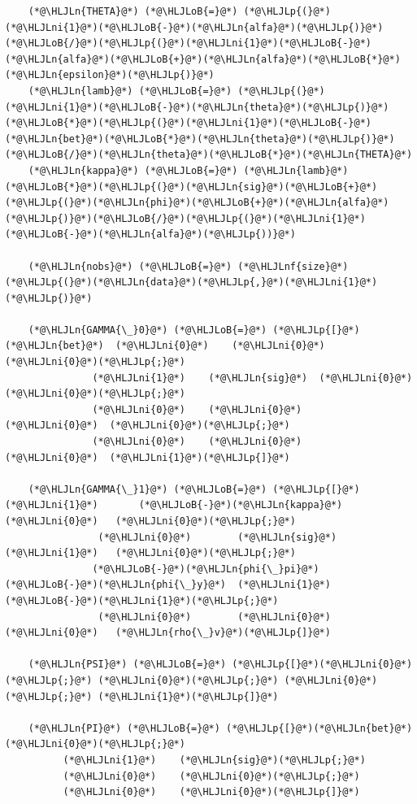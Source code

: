 \documentclass[12pt,a4paper]{article}
\newcommand{\HLJLn}[1]{#1}
\newcommand{\HLJLnf}[1]{\textcolor[RGB]{66,102,213}{#1}}
\newcommand{\HLJLni}[1]{\textcolor[RGB]{59,151,46}{#1}}
\newcommand{\HLJLoB}[1]{\textcolor[RGB]{102,102,102}{\textbf{#1}}}
\newcommand{\HLJLp}[1]{#1}
\begin{document}
\begin{lstlisting}
    (*@\HLJLn{THETA}@*) (*@\HLJLoB{=}@*) (*@\HLJLp{(}@*)(*@\HLJLni{1}@*)(*@\HLJLoB{-}@*)(*@\HLJLn{alfa}@*)(*@\HLJLp{)}@*)(*@\HLJLoB{/}@*)(*@\HLJLp{(}@*)(*@\HLJLni{1}@*)(*@\HLJLoB{-}@*)(*@\HLJLn{alfa}@*)(*@\HLJLoB{+}@*)(*@\HLJLn{alfa}@*)(*@\HLJLoB{*}@*)(*@\HLJLn{epsilon}@*)(*@\HLJLp{)}@*)
    (*@\HLJLn{lamb}@*) (*@\HLJLoB{=}@*) (*@\HLJLp{(}@*)(*@\HLJLni{1}@*)(*@\HLJLoB{-}@*)(*@\HLJLn{theta}@*)(*@\HLJLp{)}@*)(*@\HLJLoB{*}@*)(*@\HLJLp{(}@*)(*@\HLJLni{1}@*)(*@\HLJLoB{-}@*)(*@\HLJLn{bet}@*)(*@\HLJLoB{*}@*)(*@\HLJLn{theta}@*)(*@\HLJLp{)}@*)(*@\HLJLoB{/}@*)(*@\HLJLn{theta}@*)(*@\HLJLoB{*}@*)(*@\HLJLn{THETA}@*)
    (*@\HLJLn{kappa}@*) (*@\HLJLoB{=}@*) (*@\HLJLn{lamb}@*)(*@\HLJLoB{*}@*)(*@\HLJLp{(}@*)(*@\HLJLn{sig}@*)(*@\HLJLoB{+}@*)(*@\HLJLp{(}@*)(*@\HLJLn{phi}@*)(*@\HLJLoB{+}@*)(*@\HLJLn{alfa}@*)(*@\HLJLp{)}@*)(*@\HLJLoB{/}@*)(*@\HLJLp{(}@*)(*@\HLJLni{1}@*)(*@\HLJLoB{-}@*)(*@\HLJLn{alfa}@*)(*@\HLJLp{))}@*)

    (*@\HLJLn{nobs}@*) (*@\HLJLoB{=}@*) (*@\HLJLnf{size}@*)(*@\HLJLp{(}@*)(*@\HLJLn{data}@*)(*@\HLJLp{,}@*)(*@\HLJLni{1}@*)(*@\HLJLp{)}@*)

    (*@\HLJLn{GAMMA{\_}0}@*) (*@\HLJLoB{=}@*) (*@\HLJLp{[}@*)(*@\HLJLn{bet}@*)  (*@\HLJLni{0}@*)    (*@\HLJLni{0}@*)  (*@\HLJLni{0}@*)(*@\HLJLp{;}@*)
               (*@\HLJLni{1}@*)    (*@\HLJLn{sig}@*)  (*@\HLJLni{0}@*)  (*@\HLJLni{0}@*)(*@\HLJLp{;}@*)
               (*@\HLJLni{0}@*)    (*@\HLJLni{0}@*)    (*@\HLJLni{0}@*)  (*@\HLJLni{0}@*)(*@\HLJLp{;}@*)
               (*@\HLJLni{0}@*)    (*@\HLJLni{0}@*)    (*@\HLJLni{0}@*)  (*@\HLJLni{1}@*)(*@\HLJLp{]}@*)

    (*@\HLJLn{GAMMA{\_}1}@*) (*@\HLJLoB{=}@*) (*@\HLJLp{[}@*) (*@\HLJLni{1}@*)       (*@\HLJLoB{-}@*)(*@\HLJLn{kappa}@*)  (*@\HLJLni{0}@*)   (*@\HLJLni{0}@*)(*@\HLJLp{;}@*)
                (*@\HLJLni{0}@*)        (*@\HLJLn{sig}@*)    (*@\HLJLni{1}@*)   (*@\HLJLni{0}@*)(*@\HLJLp{;}@*)
               (*@\HLJLoB{-}@*)(*@\HLJLn{phi{\_}pi}@*)  (*@\HLJLoB{-}@*)(*@\HLJLn{phi{\_}y}@*)  (*@\HLJLni{1}@*)  (*@\HLJLoB{-}@*)(*@\HLJLni{1}@*)(*@\HLJLp{;}@*)
                (*@\HLJLni{0}@*)        (*@\HLJLni{0}@*)      (*@\HLJLni{0}@*)   (*@\HLJLn{rho{\_}v}@*)(*@\HLJLp{]}@*)

    (*@\HLJLn{PSI}@*) (*@\HLJLoB{=}@*) (*@\HLJLp{[}@*)(*@\HLJLni{0}@*)(*@\HLJLp{;}@*) (*@\HLJLni{0}@*)(*@\HLJLp{;}@*) (*@\HLJLni{0}@*)(*@\HLJLp{;}@*) (*@\HLJLni{1}@*)(*@\HLJLp{]}@*)

    (*@\HLJLn{PI}@*) (*@\HLJLoB{=}@*) (*@\HLJLp{[}@*)(*@\HLJLn{bet}@*)  (*@\HLJLni{0}@*)(*@\HLJLp{;}@*)
          (*@\HLJLni{1}@*)    (*@\HLJLn{sig}@*)(*@\HLJLp{;}@*)
          (*@\HLJLni{0}@*)    (*@\HLJLni{0}@*)(*@\HLJLp{;}@*)
          (*@\HLJLni{0}@*)    (*@\HLJLni{0}@*)(*@\HLJLp{]}@*)


\end{lstlisting}
\end{document}
